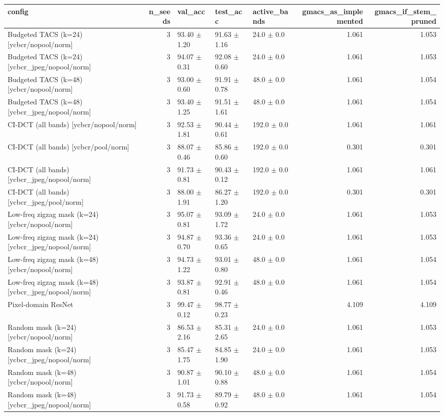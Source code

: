 \begin{tabular}{lrlllrr}
\toprule
config & n_seeds & val_acc & test_acc & active_bands & gmacs_as_implemented & gmacs_if_stem_pruned \\
\midrule
Budgeted TACS (k=24) [ycbcr/nopool/norm] & 3 & 93.40 $\pm$ 1.20 & 91.63 $\pm$ 1.16 & 24.0 $\pm$ 0.0 & 1.061 & 1.053 \\
Budgeted TACS (k=24) [ycbcr_jpeg/nopool/norm] & 3 & 94.07 $\pm$ 0.31 & 92.08 $\pm$ 0.60 & 24.0 $\pm$ 0.0 & 1.061 & 1.053 \\
Budgeted TACS (k=48) [ycbcr/nopool/norm] & 3 & 93.00 $\pm$ 0.60 & 91.91 $\pm$ 0.78 & 48.0 $\pm$ 0.0 & 1.061 & 1.054 \\
Budgeted TACS (k=48) [ycbcr_jpeg/nopool/norm] & 3 & 93.40 $\pm$ 1.25 & 91.51 $\pm$ 1.61 & 48.0 $\pm$ 0.0 & 1.061 & 1.054 \\
CI-DCT (all bands) [ycbcr/nopool/norm] & 3 & 92.53 $\pm$ 1.81 & 90.44 $\pm$ 0.61 & 192.0 $\pm$ 0.0 & 1.061 & 1.061 \\
CI-DCT (all bands) [ycbcr/pool/norm] & 3 & 88.07 $\pm$ 0.46 & 85.86 $\pm$ 0.60 & 192.0 $\pm$ 0.0 & 0.301 & 0.301 \\
CI-DCT (all bands) [ycbcr_jpeg/nopool/norm] & 3 & 91.73 $\pm$ 0.81 & 90.43 $\pm$ 0.12 & 192.0 $\pm$ 0.0 & 1.061 & 1.061 \\
CI-DCT (all bands) [ycbcr_jpeg/pool/norm] & 3 & 88.00 $\pm$ 1.91 & 86.27 $\pm$ 1.20 & 192.0 $\pm$ 0.0 & 0.301 & 0.301 \\
Low-freq zigzag mask (k=24) [ycbcr/nopool/norm] & 3 & 95.07 $\pm$ 0.81 & 93.09 $\pm$ 1.72 & 24.0 $\pm$ 0.0 & 1.061 & 1.053 \\
Low-freq zigzag mask (k=24) [ycbcr_jpeg/nopool/norm] & 3 & 94.87 $\pm$ 0.70 & 93.36 $\pm$ 0.65 & 24.0 $\pm$ 0.0 & 1.061 & 1.053 \\
Low-freq zigzag mask (k=48) [ycbcr/nopool/norm] & 3 & 94.73 $\pm$ 1.22 & 93.01 $\pm$ 0.80 & 48.0 $\pm$ 0.0 & 1.061 & 1.054 \\
Low-freq zigzag mask (k=48) [ycbcr_jpeg/nopool/norm] & 3 & 93.87 $\pm$ 0.81 & 92.91 $\pm$ 0.46 & 48.0 $\pm$ 0.0 & 1.061 & 1.054 \\
Pixel-domain ResNet & 3 & 99.47 $\pm$ 0.12 & 98.77 $\pm$ 0.23 &  & 4.109 & 4.109 \\
Random mask (k=24) [ycbcr/nopool/norm] & 3 & 86.53 $\pm$ 2.16 & 85.31 $\pm$ 2.65 & 24.0 $\pm$ 0.0 & 1.061 & 1.053 \\
Random mask (k=24) [ycbcr_jpeg/nopool/norm] & 3 & 85.47 $\pm$ 1.75 & 84.85 $\pm$ 1.90 & 24.0 $\pm$ 0.0 & 1.061 & 1.053 \\
Random mask (k=48) [ycbcr/nopool/norm] & 3 & 90.87 $\pm$ 1.01 & 90.10 $\pm$ 0.88 & 48.0 $\pm$ 0.0 & 1.061 & 1.054 \\
Random mask (k=48) [ycbcr_jpeg/nopool/norm] & 3 & 91.73 $\pm$ 0.58 & 89.79 $\pm$ 0.92 & 48.0 $\pm$ 0.0 & 1.061 & 1.054 \\
\bottomrule
\end{tabular}

